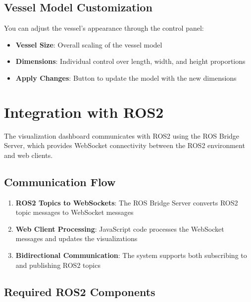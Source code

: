 \documentclass[
  letterpaper,
  DIV=11,
  numbers=noendperiod]{scrreprt}
\providecommand{\tightlist}{%
  \setlength{\itemsep}{0pt}\setlength{\parskip}{0pt}}\usepackage{longtable,booktabs,array}
\begin{document}
\subsection*{Vessel Model
Customization}\label{vessel-model-customization}

You can adjust the vessel's appearance through the control panel:

\begin{itemize}
\tightlist
\item
  \textbf{Vessel Size}: Overall scaling of the vessel model
\item
  \textbf{Dimensions}: Individual control over length, width, and height
  proportions
\item
  \textbf{Apply Changes}: Button to update the model with the new
  dimensions
\end{itemize}

\section*{Integration with ROS2}\label{integration-with-ros2}


The visualization dashboard communicates with ROS2 using the ROS Bridge
Server, which provides WebSocket connectivity between the ROS2
environment and web clients.

\subsection*{Communication Flow}\label{communication-flow}

\begin{enumerate}
\def\labelenumi{\arabic{enumi}.}
\tightlist
\item
  \textbf{ROS2 Topics to WebSockets}: The ROS Bridge Server converts
  ROS2 topic messages to WebSocket messages
\item
  \textbf{Web Client Processing}: JavaScript code processes the
  WebSocket messages and updates the visualizations
\item
  \textbf{Bidirectional Communication}: The system supports both
  subscribing to and publishing ROS2 topics
\end{enumerate}

\subsection*{Required ROS2 Components}\label{required-ros2-components}
\end{document}
